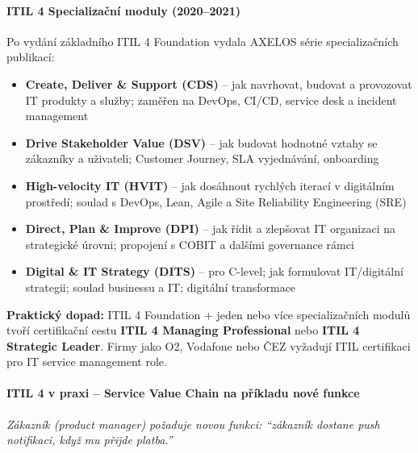 \paragraph{ITIL 4 Specializační moduly (2020--2021)}
Po vydání základního ITIL 4 Foundation vydala AXELOS série specializačních publikací:
\begin{itemize}
  \item \textbf{Create, Deliver \& Support (CDS)} -- jak navrhovat, budovat a provozovat IT produkty a služby;
    zaměřen na DevOps, CI/CD, service desk a incident management
  \item \textbf{Drive Stakeholder Value (DSV)} -- jak budovat hodnotné vztahy se zákazníky a uživateli;
    Customer Journey, SLA vyjednávání, onboarding
  \item \textbf{High-velocity IT (HVIT)} -- jak dosáhnout rychlých iterací v digitálním prostředí;
    soulad s DevOps, Lean, Agile a Site Reliability Engineering (SRE)
  \item \textbf{Direct, Plan \& Improve (DPI)} -- jak řídit a zlepšovat IT organizaci na strategické úrovni;
    propojení s COBIT a dalšími governance rámci
  \item \textbf{Digital \& IT Strategy (DITS)} -- pro C-level; jak formulovat IT/digitální strategii;
    soulad businessu a IT; digitální transformace
\end{itemize}

\textbf{Praktický dopad:} ITIL 4 Foundation + jeden nebo více specializačních modulů tvoří
certifikační cestu \textbf{ITIL 4 Managing Professional} nebo \textbf{ITIL 4 Strategic Leader}.
Firmy jako O2, Vodafone nebo ČEZ vyžadují ITIL certifikaci pro IT service management role.

\paragraph{ITIL 4 v praxi -- Service Value Chain na příkladu nové funkce}

\textit{Zákazník (product manager) požaduje novou funkci: ``zákazník dostane push notifikaci, když mu přijde platba.''}

